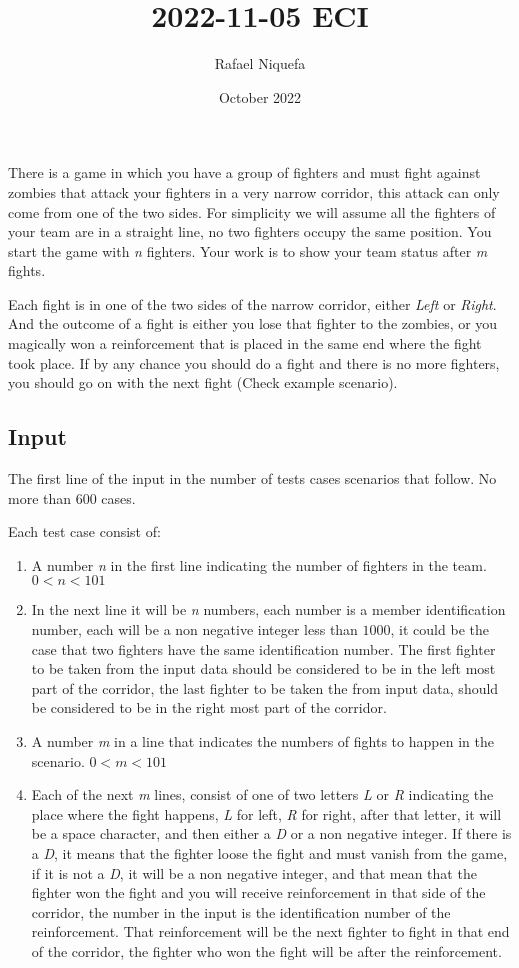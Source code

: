 \documentclass{article}
\title{2022-11-05 ECI}
\author{Rafael Niquefa}
\date{October 2022}
\begin{document}

There is a game in which you have a group of fighters and must fight against zombies that attack your fighters in a very narrow corridor, this attack can only come from one of the two sides. For simplicity we will assume all the fighters of your team are in a straight line, no two fighters occupy the same position. You start the game with \textit{n} fighters. Your work is to show your team status after \textit{m} fights.

Each fight is in one of the two sides of the narrow corridor, either \textit{Left} or \textit{Right}. And the outcome of a fight is either you lose that fighter to the zombies, or you magically won a reinforcement that is placed in the same end where the fight took place. If by any chance you should do a fight and there is no more fighters, you should go on with the next fight (Check example scenario).


\subsection* {Input}

The first line of the input in the number of tests cases scenarios that follow.  No more than 600 cases.

Each test case consist of:

\begin{enumerate}
	\item A number \textit{n} in the first line indicating the number of fighters in the team. $0 < n < 101$
	\item In the next line it will be \textit{n} numbers, each number is a member identification number, each will be a non negative integer less than $1000$, it could be the case that two fighters have the same identification number. The first fighter to be taken from the input data should be considered to be in the left most part of the corridor, the last fighter to be taken the from input data, should be considered to be in the right most part of the corridor.
	\item A number \textit{m} in a line that indicates the numbers of fights to happen in the scenario. $0 < m < 101$
	\item Each of the next \textit{m} lines, consist of one of two letters \textit{L} or \textit{R} indicating the place where the fight happens, \textit{L} for left, \textit{R} for right, after that letter, it will be a space character, and then either a \textit{D} or a non negative integer. If there is a \textit{D}, it means  that the fighter loose the fight and must vanish from the game, if it is not a \textit{D}, it will be a non negative integer, and that mean that the fighter won the fight and you will receive reinforcement in that side of the corridor, the number in the input is the identification number of the reinforcement. That reinforcement will be the next fighter to fight in that end of the corridor, the fighter who won the fight will be after the reinforcement. 
\end{enumerate}
\end{document}
